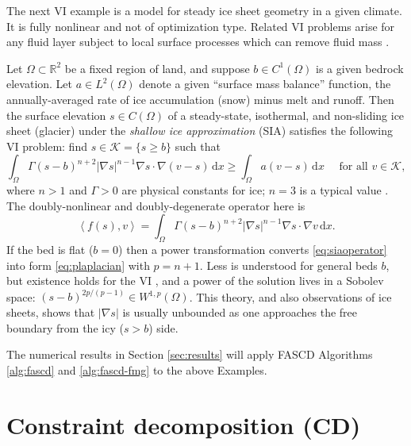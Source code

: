 \documentclass[review,hidelinks,onefignum,onetabnum,final]{siamart220329}  %
\newcommand{\RR}{\mathbb{R}}
\newcommand{\grad}{\nabla}
\newcommand{\ip}[2]{\left<#1,#2\right>}
\newcommand{\dx}{\, \mathrm{d}x}
\begin{document}
The next VI example is a model for steady ice sheet geometry in a given climate.  It is fully nonlinear and not of optimization type.  Related VI problems arise for any fluid layer subject to local surface processes which can remove fluid mass \cite{Bueler2021conservation}.

\begin{example}  \label{ex:sia}  Let $\Omega \subset \RR^2$ be a fixed region of land, and suppose $b \in C^1(\Omega)$ is a given bedrock elevation.  Let $a \in L^2(\Omega)$ denote a given ``surface mass balance'' function, the annually-averaged rate of ice accumulation (snow) minus melt and runoff.  Then the surface elevation $s\in C(\Omega)$ of a steady-state, isothermal, and non-sliding ice sheet (glacier) under the \emph{shallow ice approximation} (SIA) \cite{GreveBlatter2009} satisfies the following VI problem: find $s \in \mathcal{K} = \{s\ge b\}$ such that
\begin{equation}
\int_\Omega \Gamma (s-b)^{n+2} |\grad s|^{n-1} \grad s \cdot \grad (v-s) \dx \ge \int_\Omega a (v-s)\dx \quad \text{ for all } v \in \mathcal{K}, \label{eq:siavi}
\end{equation}
where $n>1$ and $\Gamma>0$ are physical constants for ice; $n=3$ is a typical value \cite{GreveBlatter2009}.  The doubly-nonlinear and doubly-degenerate operator here is
\begin{equation}
\ip{f(s)}{v} = \int_\Omega \Gamma (s-b)^{n+2} |\grad s|^{n-1} \grad s \cdot \grad v\dx. \label{eq:siaoperator}
\end{equation}
If the bed is flat ($b=0$) then a power transformation converts \eqref{eq:siaoperator} into form \eqref{eq:plaplacian} with $p=n+1$.  Less is understood for general beds $b$, but existence holds for the VI \cite{JouvetBueler2012}, and a power of the solution lives in a Sobolev space: $(s-b)^{2p/(p-1)} \in W^{1,p}(\Omega)$.  This theory, and also observations of ice sheets, shows that $|\grad s|$ is usually unbounded as one approaches the free boundary from the icy ($s>b$) side.
\end{example}

The numerical results in Section \ref{sec:results} will apply FASCD Algorithms \ref{alg:fascd} and \ref{alg:fascd-fmg} to the above Examples.


\section{Constraint decomposition (CD)} \label{sec:cd}
\end{document}
